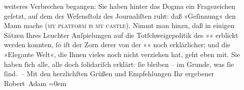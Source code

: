 \begin{ledgroupsized}[t]{13cm}
               weiteres Verbrechen begangen: Sie haben hinter das Dogma ein Fragezeichen geſetzt,
               auf dem der Weſensſtolz des Journaliſten ruht: daß »Geſinnung« den Mann mache (\textsc{my platform is my castle}). Nimmt man hinzu, daß in einigen
               Sätzen Ihres Leuchter
               Anſpielungen auf die Totſchweigepolitik des »\label{K_L02281_1v}\label{K_L02281_1h}« erblickt werden konnten, ſo iſt der
               Zorn derer von der »\label{K_L02281_2v}\label{K_L02281_2h}« noch
               erklärlicher; und die »Elegante Welt«, die Ihnen vieles noch nicht verziehen hat,
               geht eben mit. Sie haben ſich alle, alle doch ſolidariſch erklärt: ſie bleiben – im
               Grunde, was ſie ſind. –\pend
           \pstart
           Mit den herzlichſten Grüßen {\pb}und
               Empfehlungen Ihr ergebener{\\[\baselineskip]}\spacefill\mbox{Robert Adam}\pend
           \leftskip=0em{}\endnumbering{}\end{ledgroupsized}  \newcommand{\dateiname}{L02281}\newcommand{\titel}{Robert Adam an Arthur Schnitzler, 23. 11. 1917}\newcommand{\editorInnen}{Martin Anton Müller und Gerd-Hermann Susen}
            \footnotesize
\begin{ledgroupsized}[t]{11.5cm}
\end{ledgroupsized}
         
      